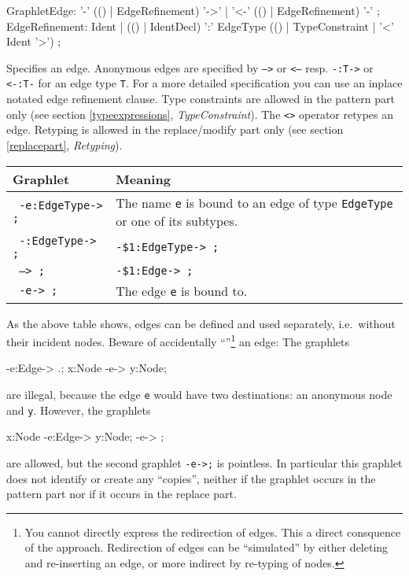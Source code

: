 \begin{rail}
  GraphletEdge: '-' (() | EdgeRefinement) '->'  | '<-' (() | EdgeRefinement) '-' ;
  EdgeRefinement: Ident | (() | IdentDecl) ':' EdgeType (() | TypeConstraint | '<' Ident '>') ;
\end{rail}
Specifies an edge. Anonymous edges are specified by \texttt{-->} or \texttt{<--} resp. \texttt{-:T->} or \texttt{<-:T-} for an edge type \texttt{T}. For a more detailed specification you can use an inplace notated edge refinement clause. Type constraints are allowed in the pattern part only (see section \ref{typeexpressions}, \emph{TypeConstraint}). The \texttt{<>} operator retypes an edge. Retyping is allowed in the replace/modify part only (see section \ref{replacepart}, \emph{Retyping}).\\
\begin{center}
  \begin{tabularx}{\linewidth}{lX}
    \textbf{Graphlet} & \textbf{Meaning}\\ \hline
    \texttt{ -e:EdgeType-> ;} & The name \texttt{e} is bound to an edge of type \texttt{EdgeType} or one of its subtypes. \\
    \texttt{ -:EdgeType-> ;} & \texttt{-\$1:EdgeType-> ;} \\
    \texttt{ --> ;} & \texttt{-\$1:Edge-> ;} \\
    \texttt{ -e-> ;} & The edge \texttt{e} is bound to.
  \end{tabularx}
\end{center} 
As the above table shows, edges can be defined and used separately, i.e.\ without their incident nodes. Beware of accidentally ``''\footnote{You cannot directly express the redirection of edges. This a direct consquence of the  approach. Redirection of edges can be ``simulated'' by either deleting and re-inserting an edge, or more indirect by re-typing of nodes.} an edge: 
The graphlets
\begin{grgenlet}
-e:Edge-> .;
x:Node -e-> y:Node;
\end{grgenlet}
are illegal, because the edge \texttt{e} would have two destinations: an anonymous node and \texttt{y}.
However, the graphlets
\begin{grgenlet}
x:Node -e:Edge-> y:Node;
-e-> ;
\end{grgenlet}
are allowed, but the second graphlet \texttt{-e->;} is pointless. In particular this graphlet does not identify or create any ``copies'', neither if the graphlet occurs in the pattern part nor if it occurs in the replace part.
